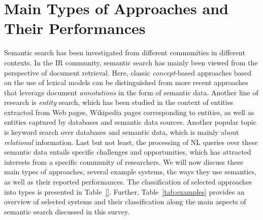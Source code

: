 \section{Main Types of Approaches and Their Performances}\label{sec:approaches}	
Semantic search has been investigated from different communities in different contexts. In the IR community, semantic search has mainly been viewed from the perspective of document retrieval. Here, classic \emph{concept}-based approaches based on the use of lexical models can be distinguished from more recent approaches that leverage document \emph{annotations} in the form of semantic data. Another line of research is \emph{entity} search, which has been studied in the context of entities extracted from Web pages, Wikipedia pages corresponding to entities, as well as entities captured by databases and semantic data sources. Another popular topic is keyword search over databases and semantic data, which is mainly about \emph{relational} information. Last but not least, the processing of NL queries over these semantic data entails specific challenges and opportunities, which has attracted interests from a specific community of researchers. We will now discuss these main types of approaches, several example systems, the ways they use semantics, as well as their reported performances. The classification of selected approaches into types is presented in Table~\ref{}. Further, Table~\ref{tab:examples} provides an overview of selected systems and their classification along the main aspects of semantic search discussed in this survey. 

